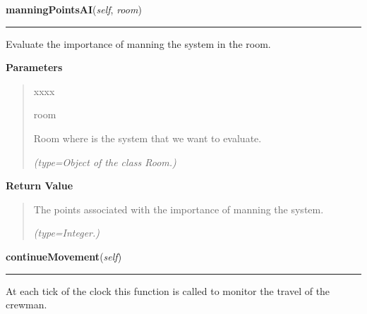     \vspace{0.5ex}

\hspace{.8\funcindent}\begin{boxedminipage}{\funcwidth}

    \raggedright \textbf{manningPointsAI}(\textit{self}, \textit{room})

    \vspace{-1.5ex}

    \rule{\textwidth}{0.5\fboxrule}
\setlength{\parskip}{2ex}
    Evaluate the importance of manning the system in the room.

\setlength{\parskip}{1ex}
      \textbf{Parameters}
      \vspace{-1ex}

      \begin{quote}
        \begin{Ventry}{xxxx}

          \item[room]

          Room where is the system that we want to evaluate.

            {\it (type=Object of the class Room.)}

        \end{Ventry}

      \end{quote}

      \textbf{Return Value}
    \vspace{-1ex}

      \begin{quote}
      The points associated with the importance of manning the system.

      {\it (type=Integer.)}

      \end{quote}

    \end{boxedminipage}

    \label{crewMember:CrewMember:continueMovement}

    \vspace{0.5ex}

\hspace{.8\funcindent}\begin{boxedminipage}{\funcwidth}

    \raggedright \textbf{continueMovement}(\textit{self})

    \vspace{-1.5ex}

    \rule{\textwidth}{0.5\fboxrule}
\setlength{\parskip}{2ex}
    At each tick of the clock this function is called to monitor the travel
    of the crewman.

\setlength{\parskip}{1ex}
    \end{boxedminipage}

